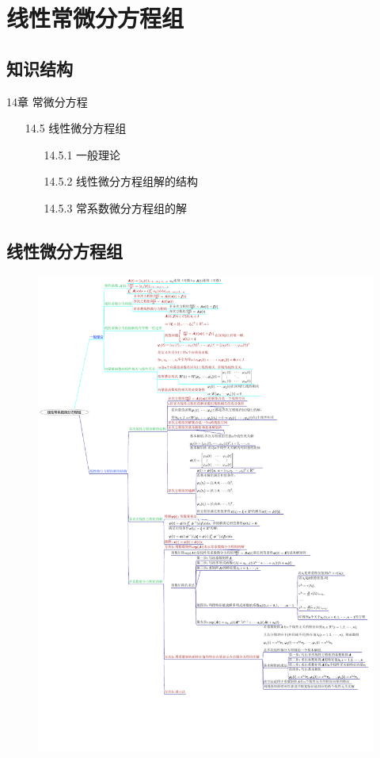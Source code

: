 \documentclass[12pt,UTF8]{ctexart}
\begin{document}
\setcounter{section}{27}
\section{线性常微分方程组}
\subsection{知识结构}
14章 常微分方程
	\begin{enumerate}
		\item[14.5]线性微分方程组
			\begin{enumerate}
				\item[14.5.1]一般理论
				\item[14.5.2]线性微分方程组解的结构
				\item[14.5.3]常系数微分方程组的解
			\end{enumerate}
	\end{enumerate}
\subsection{线性微分方程组}
\begin{figure}[H]
\begin{center}
\includegraphics[height=1\textheight]{Figures28/Structures.pdf}
\end{center}
\end{figure}
\end{document}
